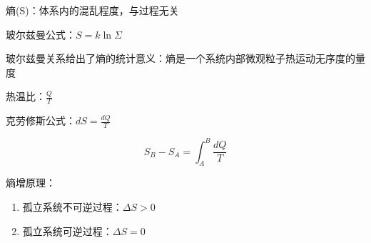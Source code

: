 熵(S)：体系内的混乱程度，与过程无关

玻尔兹曼公式：$S=\mathit{k}\ln{\Sigma}$

玻尔兹曼关系给出了熵的统计意义：熵是一个系统内部微观粒子热运动无序度的量度

热温比：$\frac{Q}{T}$

克劳修斯公式：$dS=\frac{dQ}{T}$

\begin{equation}
    S_B-S_A=\int_A^B{\frac{dQ}{T}}
\end{equation}

熵增原理：
\begin{enumerate}
    \item 孤立系统不可逆过程：$\Delta{S}>0$
    \item 孤立系统可逆过程：$\Delta{S}=0$
\end{enumerate}